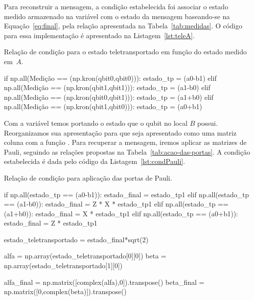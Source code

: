 Para reconstruir a mensagem, a condição estabelecida foi associar o estado medido armazenado na variável  com o estado da mensagem baseando-se na Equação~\eqref{eq:final}, pela relação apresentada na Tabela~\ref{tab:medidas}. O código para essa implementação é apresentado na Listagem~\ref{lst:teleA}.

\begin{listing}[ht!]
  \caption{Relação de condição para o estado teletransportado em função do estado medido em~\(A\).}\label{lst:teleA}
  \begin{pycode}
      if  np.all(Medição == (np.kron(qbit0,qbit0))):
    estado_tp = (a0-b1)
	  elif  np.all(Medição == (np.kron(qbit1,qbit1))):
    estado_tp = (a1-b0)
      elif  np.all(Medição == (np.kron(qbit0,qbit1))):
    estado_tp = (a1+b0)
      elif np.all(Medição == (np.kron(qbit1,qbit0))):
    estado_tp = (a0+b1)
  \end{pycode}
\end{listing}

Com a variável  temos portando o estado que o qubit no local \(B\) possui. Reorganizamos sua apresentação para que seja apresentado como uma matriz coluna com a função . Para recuperar a mensagem, iremos aplicar as matrizes de Pauli, seguindo as relações propostas na Tabela~\ref{tab:acao-das-portas}. A condição estabelecida é dada pelo código da Listagem~\ref{lst:condPauli}.

\begin{listing}[ht!]
  \caption{Relação de condição para aplicação das portas de Pauli.}\label{lst:condPauli}
  \begin{pycode}
      if np.all(estado_tp == (a0-b1)):
          estado_final = estado_tp1
      elif np.all(estado_tp == (a1-b0)):
          estado_final = Z * X * estado_tp1
      elif np.all(estado_tp == (a1+b0)):
          estado_final = X * estado_tp1
      elif np.all(estado_tp == (a0+b1)):
          estado_final = Z * estado_tp1
    
      estado_teletransportado = estado_final*sqrt(2)

      alfa = np.array(estado_teletransportado[0][0])
	  beta = np.array(estado_teletransportado[1][0])

      alfa_final = np.matrix([complex(alfa),0]).transpose()
      beta_final = np.matrix([0,complex(beta)]).transpose()
  \end{pycode}
\end{listing}

